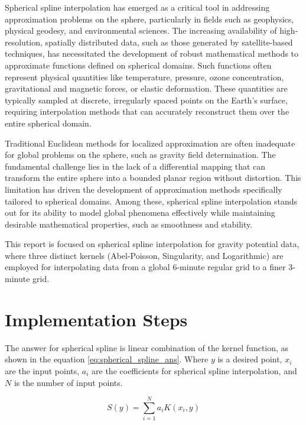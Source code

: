 \documentclass[12pt]{article}
\begin{document}
	Spherical spline interpolation has emerged as a critical tool in addressing approximation problems on the sphere, particularly in fields such as geophysics, physical geodesy, and environmental sciences. The increasing availability of high-resolution, spatially distributed data, such as those generated by satellite-based techniques, has necessitated the development of robust mathematical methods to approximate functions defined on spherical domains. Such functions often represent physical quantities like temperature, pressure, ozone concentration, gravitational and magnetic forces, or elastic deformation. These quantities are typically sampled at discrete, irregularly spaced points on the Earth's surface, requiring interpolation methods that can accurately reconstruct them over the entire spherical domain.
	
	Traditional Euclidean methods for localized approximation are often inadequate for global problems on the sphere, such as gravity field determination. The fundamental challenge lies in the lack of a differential mapping that can transform the entire sphere into a bounded planar region without distortion. This limitation has driven the development of approximation methods specifically tailored to spherical domains. Among these, spherical spline interpolation stands out for its ability to model global phenomena effectively while maintaining desirable mathematical properties, such as smoothness and stability.
	
	This report is focused on spherical spline interpolation for gravity potential data, where three distinct kernels (Abel-Poisson, Singularity, and Logarithmic) are employed for interpolating data from a global 6-minute regular grid to a finer 3-minute grid.
		
	\section{Implementation Steps}
	
	The answer for spherical spline is linear combination of the kernel function, as shown in the equation \ref{eq:spherical_spline_ans}. Where $y$ is a desired point, $x_i$ are the input points, $a_i$ are the coefficients for spherical spline interpolation, and $N$ is the number of input points.
	
	\begin{equation}
		S(y) = \sum_{i=1}^{N}a_iK(x_i,y)
		\label{eq:spherical_spline_ans}
	\end{equation}
	
\end{document}
